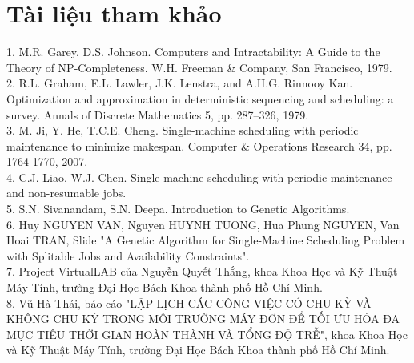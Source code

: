 \documentclass[a4paper,12pt]{article}
\begin{document}
\section{Tài liệu tham khảo}
1.	M.R. Garey, D.S. Johnson. Computers and Intractability: A Guide to the Theory of NP-Completeness. W.H. Freeman \& Company, San Francisco, 1979.\\
2.	R.L. Graham, E.L. Lawler, J.K. Lenstra, and A.H.G. Rinnooy Kan. Optimization and approximation in deterministic sequencing and scheduling: a survey. Annals of Discrete Mathematics 5, pp. 287–326, 1979.\\
3.	M. Ji, Y. He, T.C.E. Cheng. Single-machine scheduling with periodic maintenance to minimize makespan. Computer \& Operations Research 34, pp. 1764-1770, 2007.\\
4.	C.J. Liao, W.J. Chen. Single-machine scheduling with periodic maintenance and non-resumable jobs.\\
5.	S.N. Sivanandam, S.N. Deepa. Introduction to Genetic Algorithms.\\
6.	Huy NGUYEN VAN, Nguyen HUYNH TUONG, Hua Phung NGUYEN, Van Hoai TRAN, Slide "A Genetic Algorithm for Single-Machine Scheduling Problem with Splitable Jobs and Availability Constraints".\\
7.	Project VirtualLAB của Nguyễn Quyết Thắng, khoa Khoa Học và Kỹ Thuật Máy Tính, trường Đại Học Bách Khoa thành phố Hồ Chí Minh.\\
8.	Vũ Hà Thái, báo cáo "LẬP LỊCH CÁC CÔNG VIỆC CÓ CHU KỲ VÀ KHÔNG CHU KỲ TRONG MÔI TRƯỜNG MÁY ĐƠN ĐỂ TỐI ƯU HÓA ĐA MỤC TIÊU THỜI GIAN HOÀN THÀNH VÀ TỔNG ĐỘ TRỄ", khoa Khoa Học và Kỹ Thuật Máy Tính, trường Đại Học Bách Khoa thành phố Hồ Chí Minh.
\end{document}
